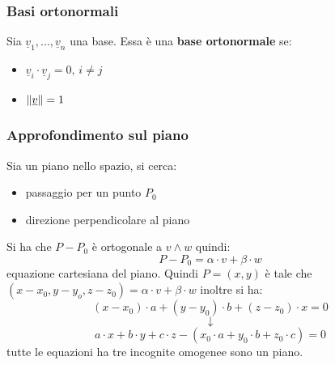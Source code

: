 \documentclass[a4paper,12pt, oneside]{book}
\begin{document}
\subsubsection{Basi ortonormali}
\begin{definizione}
Sia $\underline{v}_1,...,\underline{v}_n$ una base. Essa è una \textbf{base ortonormale }se:
\begin{itemize}
\item $\underline{v}_i\cdot \underline{v}_j=0,\, i\neq j$
\item $\left\lVert {\underline{v}} \right\rVert=1$
\end{itemize}
\end{definizione}
\subsubsection{Approfondimento sul piano}
Sia un piano nello spazio, si cerca:
\begin{itemize}
\item passaggio per un punto $P_0$
\item direzione perpendicolare al piano 
\end{itemize}
Si ha che $P-P_0$ è ortogonale a $v\land w$ quindi:
$$P-P_0=\alpha	\cdot v+\beta\cdot w$$
equazione cartesiana del piano. Quindi $P=(x,y)$ è tale che $(x-x_0,y-y_o,z-z_0)=\alpha\cdot v+\beta\cdot w$
inoltre si ha:
$$(x-x_0)\cdot a+(y-y_0)\cdot b+(z-z_0)\cdot x=0$$
$$\downarrow$$
$$a\cdot x+b\cdot y+c\cdot z-(x_0\cdot a+y_0\cdot b+z_0\cdot c)=0$$
tutte le equazioni ha tre incognite omogenee sono un piano.
\end{document}
